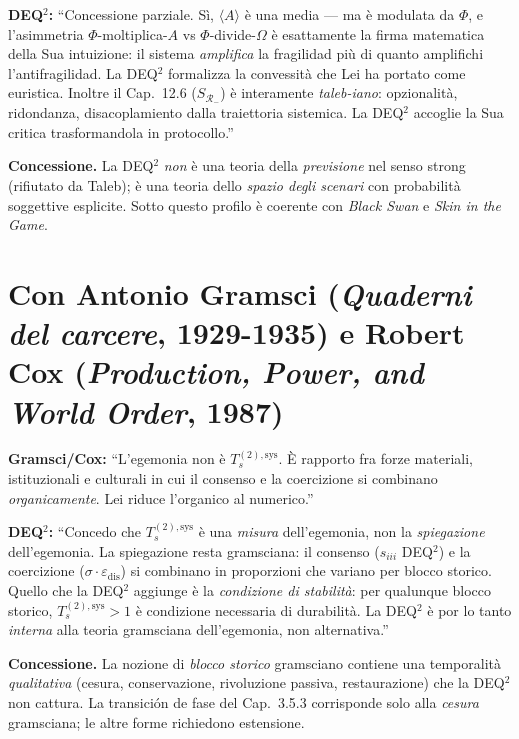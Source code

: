 \textbf{DEQ$^2$:} ``Concessione parziale. Sì, \(\langle A\rangle\) è una
media --- ma è modulata da \(\Phi\), e l'asimmetria
\(\Phi\)-moltiplica-\(A\) vs \(\Phi\)-divide-\(\Omega\) è esattamente la
firma matematica della Sua intuizione: il sistema \emph{amplifica} la
fragilidad più di quanto amplifichi l'antifragilidad. La DEQ$^2$ formalizza
la convessità che Lei ha portato come euristica. Inoltre il Cap.~12.6
(\(S_{\mathcal{R}_-}\)) è interamente \emph{taleb-iano}: opzionalità,
ridondanza, disacoplamiento dalla traiettoria sistemica. La DEQ$^2$
accoglie la Sua critica trasformandola in protocollo.''

\textbf{Concessione.} La DEQ$^2$ \emph{non} è una teoria della
\emph{previsione} nel senso strong (rifiutato da Taleb); è una teoria
dello \emph{spazio degli scenari} con probabilità soggettive esplicite.
Sotto questo profilo è coerente con \emph{Black Swan} e \emph{Skin in
the Game}.



\section{\texorpdfstring{Con Antonio Gramsci (\emph{Quaderni del
carcere}, 1929-1935) e Robert Cox (\emph{Production, Power, and World
Order},
1987)}{Con Antonio Gramsci (Quaderni del carcere, 1929-1935) e Robert Cox (Production, Power, and World Order, 1987)}}\label{con-antonio-gramsci-quaderni-del-carcere-1929-1935-e-robert-cox-production-power-and-world-order-1987}

\textbf{Gramsci/Cox:} ``L'egemonia non è \(T_s^{(2),\text{sys}}\). È
rapporto fra forze materiali, istituzionali e culturali in cui il
consenso e la coercizione si combinano \emph{organicamente}. Lei riduce
l'organico al numerico.''

\textbf{DEQ$^2$:} ``Concedo che \(T_s^{(2),\text{sys}}\) è una
\emph{misura} dell'egemonia, non la \emph{spiegazione} dell'egemonia. La
spiegazione resta gramsciana: il consenso (\(s_{iii}\) DEQ$^2$) e la
coercizione (\(\sigma \cdot \varepsilon_{\text{dis}}\)) si combinano in
proporzioni che variano per blocco storico. Quello che la DEQ$^2$ aggiunge
è la \emph{condizione di stabilità}: per qualunque blocco storico,
\(T_s^{(2),\text{sys}} > 1\) è condizione necessaria di durabilità. La
DEQ$^2$ è por lo tanto \emph{interna} alla teoria gramsciana dell'egemonia, non
alternativa.''

\textbf{Concessione.} La nozione di \emph{blocco storico} gramsciano
contiene una temporalità \emph{qualitativa} (cesura, conservazione,
rivoluzione passiva, restaurazione) che la DEQ$^2$ non cattura. La
transición de fase del Cap.~3.5.3 corrisponde solo alla \emph{cesura}
gramsciana; le altre forme richiedono estensione.



